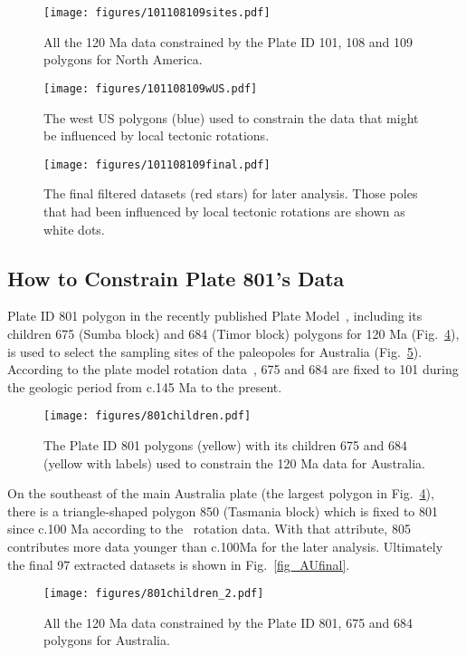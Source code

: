 \begin{figure}
\texttt{[image: figures/101108109sites.pdf]}
\caption{All the 120 Ma data constrained by the Plate ID 101, 108
and 109 polygons for North America.}\label{fig_NApmdata}
\end{figure}

\begin{figure}
\texttt{[image: figures/101108109wUS.pdf]}
\caption{The west US polygons (blue) used to constrain the data that might be
  influenced by local tectonic rotations.}\label{fig_NAwUS}
\end{figure}

\begin{figure}
\texttt{[image: figures/101108109final.pdf]}
\caption{The final filtered datasets (red stars) for later analysis. Those
poles that had been influenced by local tectonic rotations are shown as white
dots.}\label{fig_NAfinal}
\end{figure}

\subsection{How to Constrain Plate 801's Data}
Plate ID 801 polygon in the recently published Plate Model~\cite{Y18}, including
its children 675 (Sumba block) and 684 (Timor block) polygons for
120 Ma (Fig.~\ref{fig_AUpolygon}), is used to select the sampling
sites of the paleopoles for Australia (Fig.~\ref{fig_AUpmdata}). According to
the plate model rotation data~\cite{Y18}, 675 and 684 are fixed to 101 during
the geologic period from c.145 Ma to the present.

\begin{figure}
\texttt{[image: figures/801children.pdf]}
\caption{The Plate ID 801 polygons (yellow) with its children 675 and 684
(yellow with labels) used to constrain the 120 Ma data for
Australia.}\label{fig_AUpolygon}
\end{figure}

On the southeast of the main Australia plate (the largest polygon in
Fig.~\ref{fig_AUpolygon}), there is a triangle-shaped polygon 850 (Tasmania
block) which is fixed to 801 since c.100 Ma according to the~\cite{Y18}
rotation data. With that attribute, 805 contributes more data younger than
c.100Ma for the later analysis. Ultimately the final 97 extracted datasets is
shown in Fig.~\ref{fig_AUfinal}.

\begin{figure}
\texttt{[image: figures/801children\_2.pdf]}
\caption{All the 120 Ma data constrained by the Plate ID 801, 675
and 684 polygons for Australia.}\label{fig_AUpmdata}
\end{figure}


